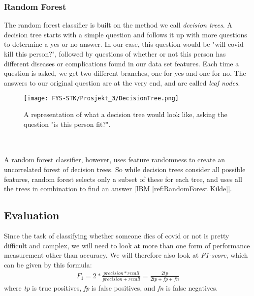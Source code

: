 \documentclass[english,notitlepage,reprint,nofootinbib]{revtex4-1}  %
\begin{document}
\subsubsection{Random Forest}
The random forest classifier is built on the method we call \textit{decision trees}. A decision tree starts with a simple question and follows it up with more questions to determine a yes or no answer. In our case, this question would be "will covid kill this person?", followed by questions of whether or not this person has different diseases or complications found in our data set features. Each time a question is asked, we get two different branches, one for yes and one for no. The answers to our original question are at the very end, and are called \textit{leaf nodes}. 
\begin{figure}[H]
    \centering
    \texttt{[image: FYS-STK/Prosjekt\_3/DecisionTree.png]}
    \caption{A representation of what a decision tree would look like, asking the question "is this person fit?".}
    \label{fig: 2}
\end{figure}
\\
\\
A random forest classifier, however, uses feature randomness to create an uncorrelated forest of decision trees. So while decision trees consider all possible features, random forest selects only a subset of these for each tree, and uses all the trees in combination to find an answer [IBM \ref{ref:RandomForest Kilde}].




\subsection{Evaluation}
Since the task of classifying whether someone dies of covid or not is pretty difficult and complex, we will need to look at more than one form of performance measurement other than accuracy. We will therefore also look at \textit{F1-score}, which can be given by this formula:
\begin{align}
    F_1 = 2*\frac{precision*recall}{precision + recall} = \frac{2tp}{2tp + fp + fn}
\end{align}
where \textit{tp} is true positives, \textit{fp} is false positives, and \textit{fn} is false negatives.
\end{document}
